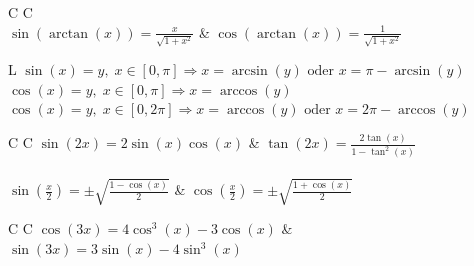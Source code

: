 \begin{tablebox}
\begin{ZSFtable}[header=false]{C C}
     \\
    $\displaystyle \sin(\arctan(x)) = \frac{x}{\sqrt{1+x^2}}$ & $\displaystyle \cos(\arctan(x)) = \frac{1}{\sqrt{1+x^2}}$ \\
\end{ZSFtable}
\end{tablebox}

\begin{tablebox}
\begin{ZSFtable}[header=false]{L}
    $\sin(x) = y,\; x \in [0, \pi] \Rightarrow x = \arcsin(y) \text{ oder } x = \pi - \arcsin(y)$ \\
    $\cos(x) = y,\; x \in [0, \pi] \Rightarrow x = \arccos(y)$ \\
    $\cos(x) = y,\; x \in [0, 2\pi] \Rightarrow x = \arccos(y) \text{ oder } x = 2\pi - \arccos(y)$ \\
\end{ZSFtable}
\end{tablebox}

\begin{tablebox}
\begin{ZSFtable}[header=false]{C C}
    $\displaystyle \sin(2x) = 2\sin(x)\cos(x)$ & $\displaystyle \tan(2x) = \frac{2\tan(x)}{1 - \tan^2(x)}$ \\
     \\
    $\displaystyle \sin\left(\frac{x}{2}\right) = \pm\sqrt{\frac{1-\cos(x)}{2}}$ & $\displaystyle \cos\left(\frac{x}{2}\right) = \pm\sqrt{\frac{1+\cos(x)}{2}}$ \\ 
\end{ZSFtable}
\end{tablebox}

\begin{tablebox}
\begin{ZSFtable}[header=false]{C C}
    $\displaystyle \cos(3x) = 4\cos^3(x) - 3\cos(x)$ & $\displaystyle \sin(3x) = 3\sin(x) - 4\sin^3(x)$ \\
     \\
     \\
     \\
\end{ZSFtable}
\end{tablebox}

